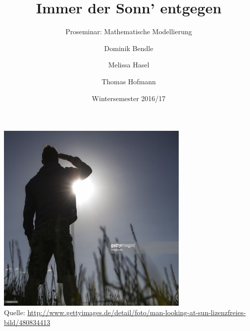 \documentclass[
    paper=a4,
    DIV14,
    fontsize=12pt,
    pagesize=pdftex,
    toc=bibliographynumbered
]{scrartcl}
\title{Immer der Sonn' entgegen}
\subtitle{Proseminar: Mathematische Modellierung}
\author{Dominik Bendle \and Melissa Hasel \and Thomas Hofmann}
\date{Wintersemester 2016/17}
\numberwithin{figure}{section}
\numberwithin{equation}{section}
\numberwithin{table}{section}
\begin{document}
\begin{titlepage}
    \maketitle
    \thispagestyle{empty}
    \centering
    \vfill
    \includegraphics[width=0.7\textwidth]{images/man_looking_at_sun.jpg} \\
    {\tiny Quelle:
    \url{http://www.gettyimages.de/detail/foto/man-looking-at-sun-lizenzfreies-bild/480834413}}
    \vfill
\end{titlepage}

\tableofcontents
\listoffigures
\newpage
\pagestyle{headings}
\end{document}
